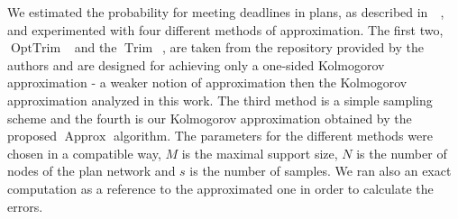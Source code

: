 \documentclass[letterpaper]{article} %
\DeclareMathOperator{\Trim}{Trim}
\DeclareMathOperator{\KlmApprox}{Approx}
\DeclareMathOperator{\OptTrim}{OptTrim}
\begin{document}


We estimated the probability for meeting deadlines in plans, as described in~~\cite{cohen2015estimating,CohenGW18}, and experimented with four different methods of approximation. The first two, $\OptTrim$~\cite{CohenGW18} and the $\Trim$~\cite{cohen2015estimating}, are taken from the repository provided by the authors and are designed for achieving only a one-sided Kolmogorov approximation - a  weaker notion of approximation then the Kolmogorov approximation analyzed in this work. The third method is a simple sampling scheme and the fourth is our Kolmogorov approximation obtained by the proposed $\KlmApprox$ algorithm. The parameters for the different methods were chosen in a compatible way, $M$ is the maximal support size, $N$ is the number of nodes of the plan network and $s$ is the number of samples. We ran also an exact computation as a reference to the approximated one in order to calculate the errors. 
\end{document}
